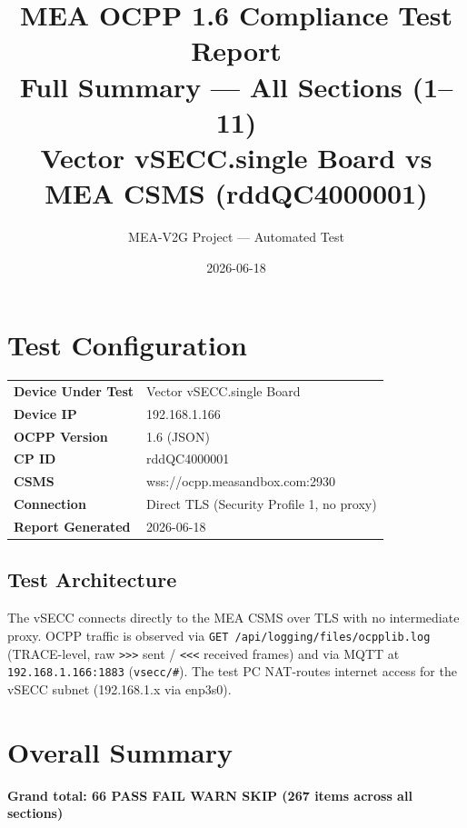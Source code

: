 \documentclass[10pt, a4paper]{article}
\title{\textbf{MEA OCPP 1.6 Compliance Test Report}\\[0.3em]
\large Full Summary --- All Sections (1--11)\\[0.3em]
\normalsize Vector vSECC.single Board vs MEA CSMS (rddQC4000001)}
\author{MEA-V2G Project --- Automated Test}
\date{2026-06-18}
\begin{document}
\maketitle
\tableofcontents
\newpage

\section{Test Configuration}
\begin{tabular}{ll}
\textbf{Device Under Test} & Vector vSECC.single Board \\
\textbf{Device IP}         & 192.168.1.166 \\
\textbf{OCPP Version}      & 1.6 (JSON) \\
\textbf{CP ID}             & rddQC4000001 \\
\textbf{CSMS}              & wss://ocpp.measandbox.com:2930 \\
\textbf{Connection}        & Direct TLS (Security Profile 1, no proxy) \\
\textbf{Report Generated}  & 2026-06-18 \\
\end{tabular}

\subsection*{Test Architecture}
The vSECC connects directly to the MEA CSMS over TLS with no intermediate proxy.
OCPP traffic is observed via \texttt{GET /api/logging/files/ocpplib.log} (TRACE-level,
raw \texttt{>>>} sent / \texttt{<<<} received frames) and via MQTT at
\texttt{192.168.1.166:1883} (\texttt{vsecc/\#}).
The test PC NAT-routes internet access for the vSECC subnet (192.168.1.x via enp3s0).

\section{Overall Summary}
\textbf{Grand total: 66 PASS  FAIL  WARN  SKIP \quad (267 items across all sections)}
\end{document}
